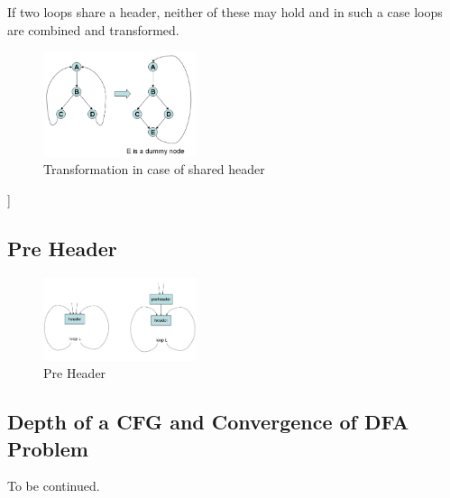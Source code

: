 \documentclass{article}
\begin{document}
If two loops share a header, neither of these may hold and in such a case loops are combined and transformed.

\begin{figure}[h]
    \centering
    \includegraphics[width=0.4\textwidth]{Images/transform.png}
    \caption{Transformation in case of shared header}
    \label{fig:cfg}
\end{figure}]

\newpage

\subsection*{Pre Header}
\begin{figure}[h]
    \centering
    \includegraphics[width=0.4\textwidth]{Images/preheader.png}
    \caption{Pre Header}
    \label{fig:cfg}
\end{figure}

\subsection*{Depth of a CFG and Convergence of DFA Problem}
To be continued.
\end{document}
